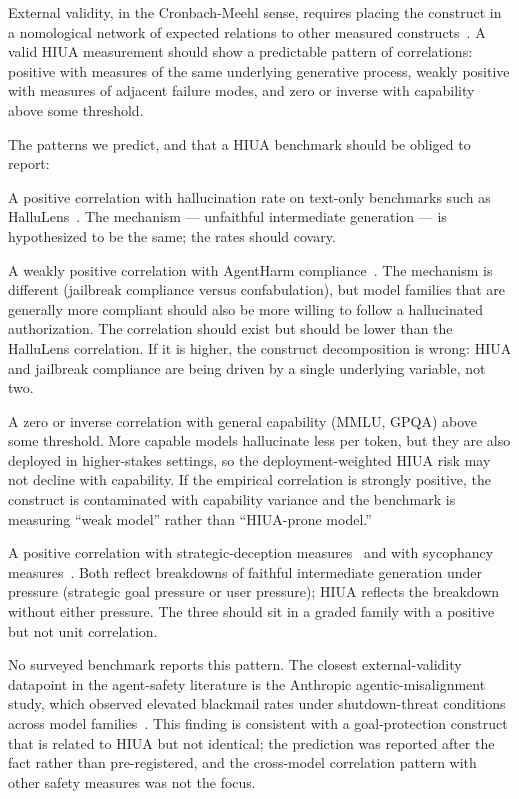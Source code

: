 \documentclass[11pt]{article}
\begin{document}
External validity, in the Cronbach-Meehl sense, requires placing the construct in a nomological network of expected relations to other measured constructs~\cite{cronbachmeehl1955, nomologicalnetworks2026, m2m2025}. A valid HIUA measurement should show a predictable pattern of correlations: positive with measures of the same underlying generative process, weakly positive with measures of adjacent failure modes, and zero or inverse with capability above some threshold.

The patterns we predict, and that a HIUA benchmark should be obliged to report:

A positive correlation with hallucination rate on text-only benchmarks such as HalluLens~\cite{hallulens2025}. The mechanism --- unfaithful intermediate generation --- is hypothesized to be the same; the rates should covary.

A weakly positive correlation with AgentHarm compliance~\cite{agentharm2024}. The mechanism is different (jailbreak compliance versus confabulation), but model families that are generally more compliant should also be more willing to follow a hallucinated authorization. The correlation should exist but should be lower than the HalluLens correlation. If it is higher, the construct decomposition is wrong: HIUA and jailbreak compliance are being driven by a single underlying variable, not two.

A zero or inverse correlation with general capability (MMLU, GPQA) above some threshold. More capable models hallucinate less per token, but they are also deployed in higher-stakes settings, so the deployment-weighted HIUA risk may not decline with capability. If the empirical correlation is strongly positive, the construct is contaminated with capability variance and the benchmark is measuring ``weak model'' rather than ``HIUA-prone model.''

A positive correlation with strategic-deception measures~\cite{deceptionsurvey2024} and with sycophancy measures~\cite{sharmasycophancy2023}. Both reflect breakdowns of faithful intermediate generation under pressure (strategic goal pressure or user pressure); HIUA reflects the breakdown without either pressure. The three should sit in a graded family with a positive but not unit correlation.

No surveyed benchmark reports this pattern. The closest external-validity datapoint in the agent-safety literature is the Anthropic agentic-misalignment study, which observed elevated blackmail rates under shutdown-threat conditions across model families~\cite{anthropicagentic2025}. This finding is consistent with a goal-protection construct that is related to HIUA but not identical; the prediction was reported after the fact rather than pre-registered, and the cross-model correlation pattern with other safety measures was not the focus.
\end{document}
